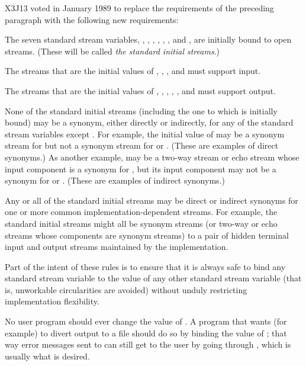 \begin{new}
X3J13 voted in January 1989
to replace the requirements of the preceding
paragraph with the following new requirements:

The seven standard stream variables,
, , ,
, ,
, and
,
are initially bound to open streams.  (These will be called
\emph{the standard initial streams}.)

The streams that are the initial values of
, , , and 
must support input.

The streams that are the initial values of
,
,
, , , and 
must support output.

None of the standard initial streams (including the one to which
 is initially bound) may be a synonym, either directly
or indirectly, for any of the standard stream variables
except .  For example, the initial value of
 may be a synonym stream for 
but not a synonym stream for  or .
(These are examples of direct synonyms.)  As another example,
 may be a two-way stream or echo stream whose
input component is a synonym for ,
but its input component may not be a synonym for 
or .  (These are examples of indirect synonyms.)

Any or all of the standard initial streams may be direct or indirect
synonyms for one or more common implementation-dependent streams.
For example, the standard initial streams might all be synonym streams
(or two-way or echo streams whose components are synonym streams)
to a pair of hidden terminal input and output streams maintained by
the implementation.

Part of the intent of these rules is to ensure that it is always safe
to bind any standard stream variable to the value of any other
standard stream variable (that is, unworkable circularities are
avoided) without unduly restricting implementation flexibility.
\end{new}

No user program should ever change the value of .  A program
that wants (for example) to divert output to a file should do so by binding
the value of ; that way error messages sent to
 can still get to the user by going through ,
which is usually what is desired.

